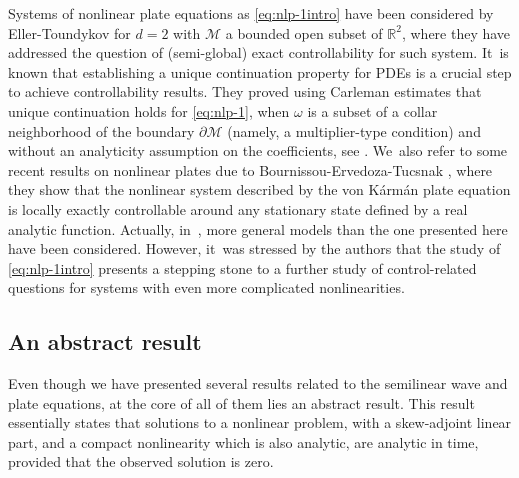 \documentclass[10pt]{amsart}
\theoremstyle{definition}
\let\mc\mathcal
\newcommand{\M}{\mc{M}}
\newcommand{\R}{\mathbb{R}}
\begin{document}
Systems of nonlinear plate equations as \eqref{eq:nlp-1intro} have been considered by Eller-Toundykov \cite{ET:15} for $d=2$ with $\M$ a bounded open subset of $\R^2$, where they have addressed the question of (semi-global) exact controllability for such system. It~is known that establishing a unique continuation property for PDEs is a crucial step to achieve controllability results. They proved using Carleman estimates that unique continuation holds for \eqref{eq:nlp-1}, when $\omega$ is a subset of a collar neighborhood of the boundary $\partial \M$ (namely, a multiplier-type condition) and without an analyticity assumption on the coefficients, see \cite[Lem.\,4.1]{ET:15}. We~also refer to some recent results on nonlinear plates due to Bournissou-Ervedoza-Tucsnak \cite{TBE24}, where they show that the nonlinear system described by the von K\'arm\'an plate equation is locally exactly controllable around any stationary state defined by a real analytic function. Actually, in~\cite{ET:15}, more general models than the one presented here have been considered. However, it~was stressed by the authors that the study of \eqref{eq:nlp-1intro} presents a stepping stone to a further study of control-related questions for systems with even more complicated nonlinearities.
\subsection{An abstract result}\label{s:abstrIntro} Even though we have presented several results related to the semilinear wave and plate equations, at the core of all of them lies an abstract result. This result essentially states that solutions to a nonlinear problem, with a skew-adjoint linear part, and a compact nonlinearity which is also analytic, are analytic in time, provided that the observed solution is zero.
\end{document}
